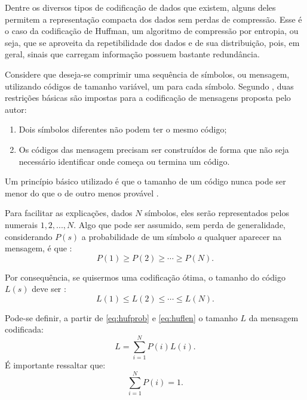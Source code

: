 \documentclass[cic,tc]{iiufrgs}
\begin{document}
Dentre os diversos tipos de codificação de dados que existem, alguns deles 
permitem a representação compacta dos dados sem perdas de compressão.
Esse é o caso da codificação de Huffman, um algoritmo de compressão por entropia,
ou seja, que se aproveita da repetibilidade dos dados e de sua distribuição, 
pois, em geral, sinais que carregam informação possuem bastante redundância.

Considere que deseja-se comprimir uma sequência de 
símbolos, ou mensagem, utilizando códigos de tamanho variável, um para cada símbolo.
Segundo \citet{HuffmanCoding}, duas restrições básicas são impostas para 
a codificação de mensagens proposta pelo autor:
\begin{enumerate}
    \item Dois símbolos diferentes não podem ter o mesmo código;
    \item Os códigos das mensagem precisam ser construídos de forma que não seja necessário 
    identificar onde começa ou termina um código.
\end{enumerate}

Um princípio básico utilizado é que o tamanho de um código nunca pode ser menor 
do que o de outro menos provável \cite{HuffmanCoding}.

Para facilitar as explicações, dados $N$ símbolos, eles serão representados 
pelos numerais $1, 2, ..., N$.
Algo que pode ser assumido, sem perda de generalidade, considerando $P(s)$ a probabilidade de um símbolo
$a$ qualquer aparecer na mensagem, é que \cite{HuffmanCoding}:
\begin{equation}
    \label{eq:hufprob}
    P(1) \ge P(2) \ge \cdots \ge P(N).
\end{equation}

Por consequência, se quisermos uma codificação ótima, o tamanho do código $L(s)$ 
deve ser \cite{HuffmanCoding}:
\begin{equation}
    \label{eq:huflen}
    L(1) \le L(2) \le \cdots \le L(N).
\end{equation}

Pode-se definir, a partir de \eqref{eq:hufprob} e \eqref{eq:huflen} o tamanho $L$ da mensagem 
codificada:
\begin{equation*}
    L = \sum_{i=1}^N {P(i)L(i)}.
\end{equation*}
É importante ressaltar que:
\begin{equation*}
    \sum_{i=1}^N {P(i)} = 1.
\end{equation*}
\end{document}
